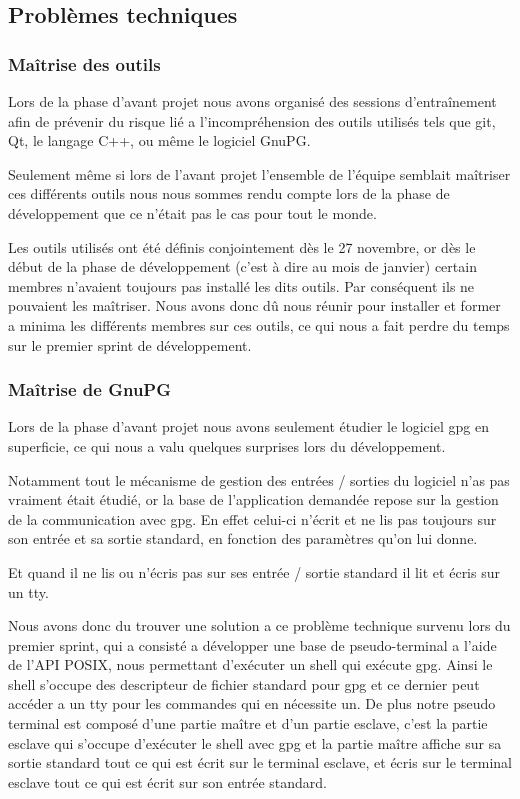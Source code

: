 \documentclass{../res/univ-projet}
\begin{document}
    
  \subsection{Problèmes techniques}

    \subsubsection{Maîtrise des outils}

      Lors de la phase d'avant projet nous avons organisé des sessions d’entraînement afin
      de prévenir du risque lié a l’incompréhension des outils utilisés tels que git, Qt, le langage C++,
      ou même le logiciel GnuPG.

      Seulement même si lors de l'avant projet l'ensemble de l'équipe semblait maîtriser ces
      différents outils nous nous sommes rendu compte lors de la phase de développement que ce n'était pas le cas
      pour tout le monde.

      Les outils utilisés ont été définis conjointement dès le 27 novembre, or dès le début de la phase de développement
      (c'est à dire au mois de janvier) certain membres n'avaient toujours pas installé les dits outils. Par conséquent
      ils ne pouvaient les maîtriser. Nous avons donc dû nous réunir pour installer et former a minima les différents membres
      sur ces outils, ce qui nous a fait perdre du temps sur le premier sprint de développement.

    \subsubsection{Maîtrise de GnuPG}
    
      Lors de la phase d'avant projet nous avons seulement étudier le logiciel gpg
      en superficie, ce qui nous a valu quelques surprises lors du développement.

      Notamment tout le mécanisme de gestion des entrées / sorties du logiciel n'as pas vraiment était
      étudié, or la base de l'application demandée repose sur la gestion de la communication avec
      gpg.
      En effet celui-ci n'écrit et ne lis pas toujours sur son entrée et sa sortie standard,
      en fonction des paramètres qu'on lui donne.

      Et quand il ne lis ou n'écris pas sur ses entrée / sortie standard il lit et écris sur un
      tty.

      Nous avons donc du trouver une solution a ce problème technique survenu lors du premier sprint,
      qui a consisté a développer une base de pseudo-terminal a l'aide de l'API POSIX, nous permettant
      d'exécuter un shell qui exécute gpg.
      Ainsi le shell s'occupe des descripteur de fichier standard pour gpg et ce dernier peut accéder a un tty
      pour les commandes qui en nécessite un.
      De plus notre pseudo terminal est composé d'une partie maître et d'un partie esclave,
      c'est la partie esclave qui s'occupe d'exécuter le shell avec gpg et la partie maître affiche
      sur sa sortie standard tout ce qui est écrit sur le terminal esclave, 
      et écris sur le terminal esclave tout ce qui est écrit sur son entrée standard.
\end{document}
